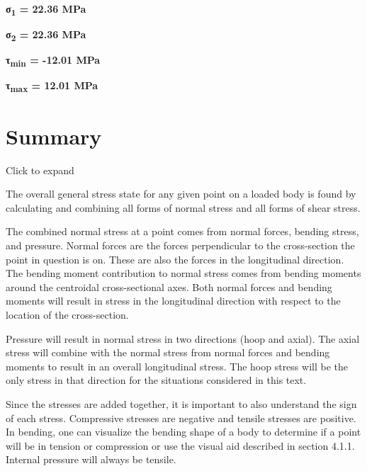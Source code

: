 \documentclass[
  letterpaper,
  DIV=11,
  numbers=noendperiod]{scrreprt}
\theoremstyle{definition}
\theoremstyle{remark}
\begin{document}
\begin{tcolorbox}
\begin{tcolorbox}
\textbf{σ\textsubscript{1} = 22.36 MPa}

\textbf{σ\textsubscript{2} = 22.36 MPa}

\textbf{τ\textsubscript{min} = -12.01 MPa}

\textbf{τ\textsubscript{max} = 12.01 MPa}

\end{tcolorbox}

\end{tcolorbox}

\section{Summary}\label{summary-13}

Click to expand

\begin{tcolorbox}[enhanced jigsaw, leftrule=.75mm, colbacktitle=quarto-callout-note-color!10!white, breakable, opacityback=0, colback=white, titlerule=0mm, toprule=.15mm, colframe=quarto-callout-note-color-frame, coltitle=black, title={Key takeaways}, toptitle=1mm, bottomrule=.15mm, rightrule=.15mm, left=2mm, arc=.35mm, opacitybacktitle=0.6, bottomtitle=1mm]

The overall general stress state for any given point on a loaded body is
found by calculating and combining all forms of normal stress and all
forms of shear stress.

The combined normal stress at a point comes from normal forces, bending
stress, and pressure. Normal forces are the forces perpendicular to the
cross-section the point in question is on. These are also the forces in
the longitudinal direction. The bending moment contribution to normal
stress comes from bending moments around the centroidal cross-sectional
axes. Both normal forces and bending moments will result in stress in
the longitudinal direction with respect to the location of the
cross-section.

Pressure will result in normal stress in two directions (hoop and
axial). The axial stress will combine with the normal stress from normal
forces and bending moments to result in an overall longitudinal stress.
The hoop stress will be the only stress in that direction for the
situations considered in this text.

Since the stresses are added together, it is important to also
understand the sign of each stress. Compressive stresses are negative
and tensile stresses are positive. In bending, one can visualize the
bending shape of a body to determine if a point will be in tension or
compression or use the visual aid described in section 4.1.1. Internal
pressure will always be tensile.


\end{tcolorbox}
\end{document}
